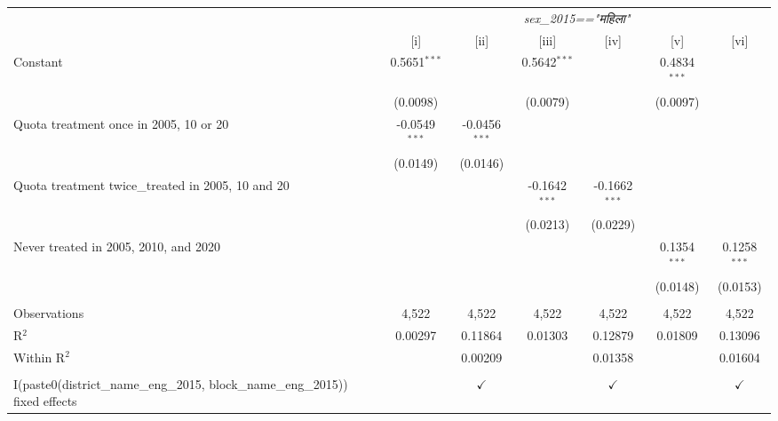 
\begingroup
\centering
\begin{tabular}{lcccccc}
   \toprule
    & \multicolumn{6}{c}{\textit{sex\_2015=="महिला"}}\\
                                                                                    & [i]             & [ii]            & [iii]           & [iv]            & [v]            & [vi]\\  
   \midrule 
   Constant                                                                         & 0.5651$^{***}$  &                 & 0.5642$^{***}$  &                 & 0.4834$^{***}$ &   \\   
                                                                                    & (0.0098)        &                 & (0.0079)        &                 & (0.0097)       &   \\   
   Quota treatment once in 2005, 10 or 20                                           & -0.0549$^{***}$ & -0.0456$^{***}$ &                 &                 &                &   \\   
                                                                                    & (0.0149)        & (0.0146)        &                 &                 &                &   \\   
   Quota treatment twice\_treated in 2005, 10 and 20                                &                 &                 & -0.1642$^{***}$ & -0.1662$^{***}$ &                &   \\   
                                                                                    &                 &                 & (0.0213)        & (0.0229)        &                &   \\   
   Never treated in 2005, 2010, and 2020                                            &                 &                 &                 &                 & 0.1354$^{***}$ & 0.1258$^{***}$\\   
                                                                                    &                 &                 &                 &                 & (0.0148)       & (0.0153)\\   
    \\
   Observations                                                                     & 4,522           & 4,522           & 4,522           & 4,522           & 4,522          & 4,522\\  
   R$^2$                                                                            & 0.00297         & 0.11864         & 0.01303         & 0.12879         & 0.01809        & 0.13096\\  
   Within R$^2$                                                                     &                 & 0.00209         &                 & 0.01358         &                & 0.01604\\  
    \\
   I(paste0(district\_name\_eng\_2015, block\_name\_eng\_2015)) fixed effects       &                 & $\checkmark$    &                 & $\checkmark$    &                & $\checkmark$\\   
   \bottomrule
\end{tabular}
\par\endgroup


